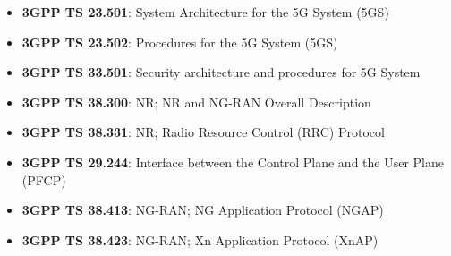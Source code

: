 \begin{itemize}
\tightlist
\item
  \textbf{3GPP TS 23.501}: System Architecture for the 5G System (5GS)
\item
  \textbf{3GPP TS 23.502}: Procedures for the 5G System (5GS)
\item
  \textbf{3GPP TS 33.501}: Security architecture and procedures for 5G System
\item
  \textbf{3GPP TS 38.300}: NR; NR and NG-RAN Overall Description
\item
  \textbf{3GPP TS 38.331}: NR; Radio Resource Control (RRC) Protocol
\item
  \textbf{3GPP TS 29.244}: Interface between the Control Plane and the User Plane (PFCP)
\item
  \textbf{3GPP TS 38.413}: NG-RAN; NG Application Protocol (NGAP)
\item
  \textbf{3GPP TS 38.423}: NG-RAN; Xn Application Protocol (XnAP)
\end{itemize}
